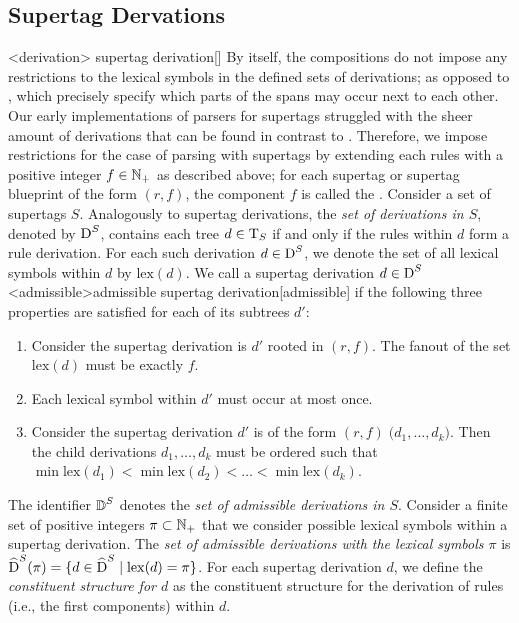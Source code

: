\documentclass[../../document.tex]{subfiles}
\begin{document}
    \subsection*{ Supertag Dervations}
    <derivation>{ supertag derivation}[]
    By itself, the  compositions do not impose any restrictions to the lexical symbols in the defined sets of derivations; as opposed to , which precisely specify which parts of the spans may occur next to each other.
    Our early implementations of parsers for  supertags struggled with the sheer amount of derivations that can be found in contrast to .
    Therefore, we impose restrictions for the case of parsing with  supertags by extending each rules with a positive integer \(f\in \mathbb{N}_+\) as described above; for each  supertag or  supertag blueprint of the form \((r,f)\), the component \(f\) is called the .
    Consider a set of  supertags \(S\).
    Analogously to  supertag derivations, the \emph{set of derivations in \(S\)}, denoted by \(\operatorname{D}^S\), contains each tree \(d \in \operatorname{T}_S\) if and only if the  rules within  \(d\) form a  rule derivation.
    For each such derivation \(d \in \operatorname{D}^S\), we denote the set of all lexical symbols within \(d\) by \(\mathrm{lex}(d)\).
    We call a  supertag derivation \(d \in \operatorname{D}^S\) <admissible>{admissible  supertag derivation}[admissible] if the following three properties are satisfied for each of its subtrees $d'$:
    \begin{enumerate}
        \item 
            Consider the  supertag derivation is $d'$ rooted in \((r,f)\).
            The fanout of the set \(\mathrm{lex}(d)\) must be exactly \(f\).
        \item
            Each lexical symbol within \(d'\) must occur at most once.
        \item\label{prop:dcp:admissible:order}
            Consider the supertag derivation $d'$ is of the form \((r,f)\;\big( d_1, \ldots, d_k \big)\).
            Then the child derivations \(d_1, \ldots, d_k\) must be ordered such that \(\min \mathrm{lex}(d_1) < \min \mathrm{lex}(d_2) < \ldots < \min \mathrm{lex}(d_k)\). 
    \end{enumerate}
    The identifier \(\operatorname{\mathbb{D}}^S\) denotes the \emph{set of admissible derivations in \(S\)}.
    Consider a finite set of positive integers \(\pi \subset \mathbb{N}_+\) that we consider possible lexical symbols within a  supertag derivation.
    The \emph{set of admissible derivations with the lexical symbols \(\pi\)} is \(\widehat{\operatorname{D}}^S(\pi) = \{d\in \widehat{\operatorname{D}}^S \mid \mathrm{lex}(d) = \pi\}\).
    For each  supertag derivation \(d\), we define the \emph{constituent structure for \(d\)} as the constituent structure for the derivation of  rules (i.e., the first components) within \(d\).
\end{document}
